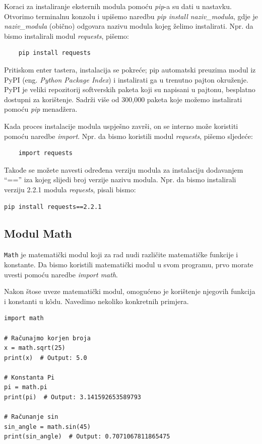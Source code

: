 Koraci za instaliranje eksternih modula pomoću \emph{pip}-a su dati u nastavku. Otvorimo terminalnu konzolu i upišemo naredbu \textit{pip install naziv\_modula}, gdje je \textit{naziv\_modula} (obično) odgovara nazivu  modula kojeg želimo instalirati. Npr. da bismo instalirali modul \textit{requests}, pišemo:
\begin{verbatim}
    pip install requests
\end{verbatim}

Pritiskom enter tastera, instalacija se pokreće; pip automatski preuzima modul iz PyPI (eng. \textit{Python Package Index}) i instalirati ga u trenutno pajton okruženje. PyPI je veliki repozitorij softverskih paketa koji su napisani u pajtonu, besplatno dostupni za korištenje. Sadrži više od 300,000 paketa koje možemo instalirati pomoću \textit{pip} menadžera.


Kada proces instalacije modula uspješno završi, on se interno može koristiti pomoću naredbe \textit{import}. Npr. da bismo koristili modul \textit{requests}, pišemo sljedeće:
\begin{verbatim}
    import requests
\end{verbatim}
Takođe se možete navesti određena verziju modula za instalaciju dodavanjem  ``==''  iza kojeg slijedi broj verzije nazivu modula. Npr. da bismo instalirali verziju 2.2.1 modula \textit{requests},  pisali bismo:
\begin{verbatim}
pip install requests==2.2.1
\end{verbatim}


\subsection{Modul Math}

\texttt{Math} je matematički modul koji za rad nudi različite matematičke funkcije i konstante. Da bismo koristili matematički modul u svom programu, prvo morate uvesti pomoću naredbe \textit{import math}.

Nakon štose uveze matematički modul, omogućeno je korištenje njegovih funkcija i konstanti u k\^odu. Navedimo nekoliko konkretnih primjera. 

\begin{verbatim}
import math

# Računajmo korjen broja
x = math.sqrt(25)
print(x)  # Output: 5.0

# Konstanta Pi
pi = math.pi
print(pi)  # Output: 3.141592653589793

# Računanje sin 
sin_angle = math.sin(45)
print(sin_angle)  # Output: 0.7071067811865475
\end{verbatim}

